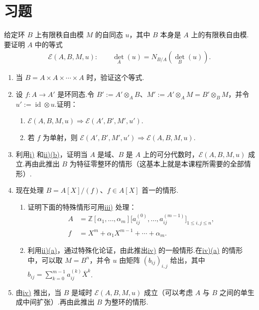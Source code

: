 \chapter*{习题}
\label{chap:nt-exercises}
\begin{exercise*}[证明范数的传递性]\label{ex:nt-norm-transitivity}
给定环 $B$ 上有限秩自由模 $M$ 的自同态 $u$，其中 $B$ 本身是 $A$ 上的有限秩自由模.要证明 $A$ 中的等式
\begin{align*}
\mathcal E(A,B,M,u)\colon\qquad\det_A(u)=N_{B/A}(\det_B(u)).
\end{align*}
\begin{enumerate}[label=\roman*)]
\item\label{item:nt-norm-transitivity-i} 当 $B=A\times A\times\cdots\times A$ 时，验证这个等式.
\item\label{item:nt-norm-transitivity-ii} 设 $f\colon A\longrightarrow A'$ 是环同态.令 $B':=A'\otimes_A B$、$M':=A'\otimes_A M=B'\otimes_B M$，并令 $u':=\operatorname{id}\otimes u$.证明：
\begin{enumerate}[label=(\alph*)]
\item\label{item:nt-norm-transitivity-ii-a} $\mathcal E(A,B,M,u)\Rightarrow\mathcal E(A',B',M',u')$.
\item\label{item:nt-norm-transitivity-ii-b} 若 $f$ 为单射，则 $\mathcal E(A',B',M',u')\Rightarrow\mathcal E(A,B,M,u)$.
\end{enumerate}
\item\label{item:nt-norm-transitivity-iii} 利用\hyperref[item:nt-norm-transitivity-i]{i)} 和\hyperref[item:nt-norm-transitivity-ii-b]{ii)(b)}，证明当 $A$ 是域、$B$ 是 $A$ 上的可分代数时，$\mathcal E(A,B,M,u)$ 成立.再由此推出 $B$ 为特征零整环的情形（这基本上就是本课程所需要的全部情形）.
\item\label{item:nt-norm-transitivity-iv} 现在处理 $B=A[X]/(f)$、$f\in A[X]$ 首一的情形.
\begin{enumerate}[label=(\alph*)]
\item\label{item:nt-norm-transitivity-iv-a} 证明下面的特殊情形可用\hyperref[item:nt-norm-transitivity-iii]{iii)} 处理：
\begin{align*}
A&=\mathbb Z[\alpha_1,\ldots,\alpha_m]\bigl[a_{ij}^{(0)},\ldots,a_{ij}^{(m-1)}\bigr]_{1\le i,j\le n},\\
f&=X^m+\alpha_1X^{m-1}+\cdots+\alpha_m.
\end{align*}
\item 利用\hyperref[item:nt-norm-transitivity-ii-a]{ii)(a)}，通过特殊化论证，由此推出\hyperref[item:nt-norm-transitivity-iv]{iv)} 的一般情形.在\hyperref[item:nt-norm-transitivity-iv-a]{iv)(a)} 的情形中，可以取 $M=B^n$，并令 $u$ 由矩阵 $(b_{ij})_{i,j}$ 给出，其中 $b_{ij}=\sum_{k=0}^{m-1}a_{ij}^{(k)}\overline X^k$.
\end{enumerate}
\item 由\hyperref[item:nt-norm-transitivity-iv]{iv)} 推出，当 $B$ 是域时 $\mathcal E(A,B,M,u)$ 成立（可以考虑 $A$ 与 $B$ 之间的单生成中间扩张）.再由此推出 $B$ 为整环的情形.
\end{enumerate}
\end{exercise*}
